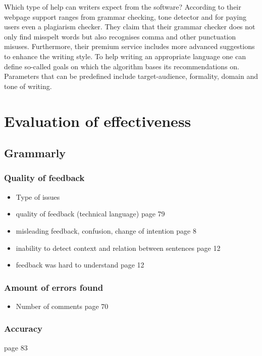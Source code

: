 \documentclass[runningheads]{llncs}
\begin{document}
Which type of help can writers expect from the software? According to their webpage \parencite{noauthor_grammarly._nodate} support ranges from grammar checking, tone detector and for paying users even a plagiarism checker. They claim that their grammar checker does not only find misspelt words but also recognises comma and other punctuation misuses. Furthermore, their premium service includes more advanced suggestions to enhance the writing style. To help writing an appropriate language one can define so-called goals on which the algorithm bases its recommendations on. Parameters that can be predefined include target-audience, formality, domain and tone of writing.   

\section{Evaluation of effectiveness}

\subsection{Grammarly}

\subsubsection{Quality of feedback}
\begin{itemize}
    \item Type of issues
    \item quality of feedback (technical language) \citep{dembsey_closing_2017} page 79
    \item misleading feedback, confusion, change of intention \citep{nova_utilizing_2018} page 8
    \item inability to detect context and relation between sentences \citep{nova_utilizing_2018} page 12
    \item feedback was hard to understand \citep{cavaleri_you_2016} page 12
\end{itemize}

\subsubsection{Amount of errors found}
\begin{itemize}
    \item Number of comments \citep{dembsey_closing_2017} page 70
\end{itemize}

\subsubsection{Accuracy}
\citep{dembsey_closing_2017} page 83
\end{document}
